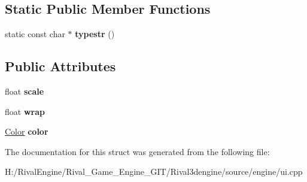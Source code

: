 \subsection*{Static Public Member Functions}
\begin{DoxyCompactItemize}
\item 
\mbox{\label{struct_u_i_1_1_text_ac5d7ba676ff9c09d5b38ccc76faa0a8b}} 
static const char $\ast$ {\bfseries typestr} ()
\end{DoxyCompactItemize}
\subsection*{Public Attributes}
\begin{DoxyCompactItemize}
\item 
\mbox{\label{struct_u_i_1_1_text_a4780930e81bebe172b81577047518028}} 
float {\bfseries scale}
\item 
\mbox{\label{struct_u_i_1_1_text_a0d5432f23bf103bf13d0d2fa6f94e593}} 
float {\bfseries wrap}
\item 
\mbox{\label{struct_u_i_1_1_text_a9168068e177a641173a9b585b38df63e}} 
\hyperlink{struct_u_i_1_1_color}{Color} {\bfseries color}
\end{DoxyCompactItemize}


The documentation for this struct was generated from the following file\+:\begin{DoxyCompactItemize}
\item 
H\+:/\+Rival\+Engine/\+Rival\+\_\+\+Game\+\_\+\+Engine\+\_\+\+G\+I\+T/\+Rival3dengine/source/engine/ui.\+cpp\end{DoxyCompactItemize}
